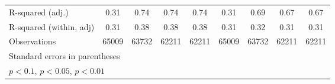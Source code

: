 {\begin{tabular}{l*{8}{c}}
R-squared (adj.)    &        0.31         &        0.74         &        0.74         &        0.74         &        0.31         &        0.69         &        0.67         &        0.67         \\
R-squared (within, adj)&        0.31         &        0.38         &        0.38         &        0.38         &        0.31         &        0.32         &        0.31         &        0.31         \\
Observations        &       65009         &       63732         &       62211         &       62211         &       65009         &       63732         &       62211         &       62211         \\
\bottomrule
\multicolumn{9}{l}{\footnotesize Standard errors in parentheses}\\
\multicolumn{9}{l}{\footnotesize \sym{*} \(p<0.1\), \sym{**} \(p<0.05\), \sym{***} \(p<0.01\)}\\
\end{tabular}
}
